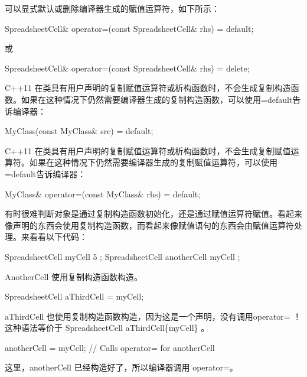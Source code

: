 可以显式默认或删除编译器生成的赋值运算符，如下所示：

\begin{cpp}
SpreadsheetCell& operator=(const SpreadsheetCell& rhs) = default;
\end{cpp}

或

\begin{cpp}
SpreadsheetCell& operator=(const SpreadsheetCell& rhs) = delete;
\end{cpp}


C++11 在类具有用户声明的复制赋值运算符或析构函数时，不会生成复制构造函数。如果在这种情况下仍然需要编译器生成的复制构造函数，可以使用=default告诉编译器：

\begin{cpp}
MyClass(const MyClass& src) = default;
\end{cpp}

C++11 在类具有用户声明的复制赋值运算符或析构函数时，不会生成复制赋值运算符。如果在这种情况下仍然需要编译器生成的复制赋值运算符，可以使用=default告诉编译器：

\begin{cpp}
MyClass& operator=(const MyClass& rhs) = default;
\end{cpp}


有时很难判断对象是通过复制构造函数初始化，还是通过赋值运算符赋值。看起来像声明的东西会使用复制构造函数，而看起来像赋值语句的东西会由赋值运算符处理。来看看以下代码：

\begin{cpp}
SpreadsheetCell myCell { 5 };
SpreadsheetCell anotherCell { myCell };
\end{cpp}

AnotherCell 使用复制构造函数构造。

\begin{cpp}
SpreadsheetCell aThirdCell = myCell;
\end{cpp}

aThirdCell 也使用复制构造函数构造，因为这是一个声明，没有调用operator= ！这种语法等价于 SpreadsheetCell aThirdCell\{myCell\} 。

\begin{cpp}
anotherCell = myCell; // Calls operator= for anotherCell
\end{cpp}

这里，anotherCell 已经构造好了，所以编译器调用 operator=。

